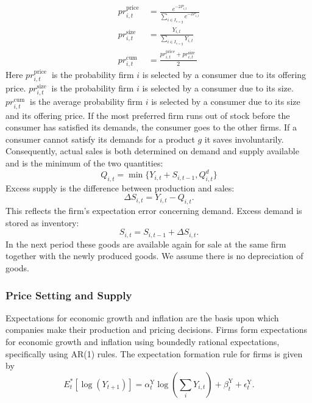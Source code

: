 \begin{equation}
\begin{aligned}
p r _{i,t}^{\text {price }}  & =\frac{e^{-2 P _{i,t} }}{\sum_{i \in I_{s=g}} e^{-2 P _{i,t} }} \\
p r _{i,t}^{\text {size }}  & =\frac{Y _{i,t} }{\sum_{i \in I_{s=g}} Y _{i,t} } \\
p r _{i,t}^{\text {cum }}  & =\frac{p r _{i,t}^{\mathrm{price}} +p r _{i,t}^{\text {size }} }{2}
\end{aligned}
\end{equation}
Here $p r _{i,t}^{\text {price }} $ is the probability firm $i$ is selected by a consumer due to its offering price. $p r _{i,t}^{\text {size }} $ is the probability firm $i$ is selected by a consumer due to its size. $p r _{i,t}^{\text {cum }} $ is the average probability firm $i$ is selected by a consumer due to its size and its offering price. If the most preferred firm runs out of stock before the consumer has satisfied its demands, the consumer goes to the other firms. If a consumer cannot satisfy its demands for a product $g$ it saves involuntarily. Consequently, actual sales is both determined on demand and supply available and is the minimum of the two quantities:
\begin{equation}
Q_{i,t} = \min \{Y_{i,t} +S_{i,t-1}, Q^d_{i,t}\}
\end{equation}
Excess supply is the difference between production and sales:
\begin{equation}
\Delta S_{i,t} = Y_{i,t}-Q_{i,t}.
\end{equation}
This reflects the firm's expectation error concerning demand. Excess demand is stored as inventory:
\begin{equation}
S_{i,t}=S_{i,t-1}+\Delta S_{i,t}.
\end{equation}
In the next period these goods are available again for sale at the same firm together with the newly produced goods. We assume there is no depreciation of goods.
\subsubsection{Price Setting and Supply}
Expectations for economic growth and inflation are the basis upon which companies make their production and pricing decisions. Firms form expectations for economic growth and inflation using boundedly rational expectations, specifically using AR(1) rules. The expectation formation rule for firms is given by
\begin{equation}
E_t^*[\log \left(Y_{t+1}\right)]=\alpha_{t}^{\mathrm{Y}} \log \left(\sum_i Y_{i,t}\right)+\beta_{t}^{\mathrm{Y}}+\epsilon_{t}^{\mathrm{Y}}. \label{eq:growthar}
\end{equation}

